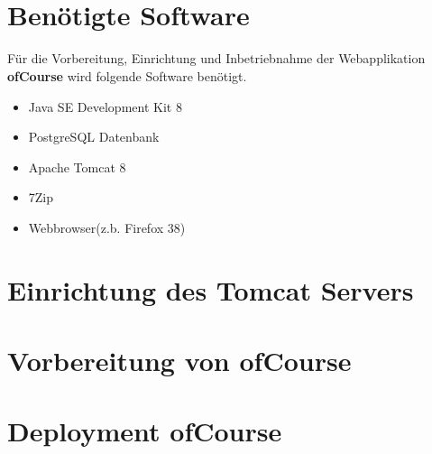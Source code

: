 \documentclass[a4paper, 12pt]{scrreprt}
\begin{document}
\begin{titlepage}
\begin{center}
        \ \\
        \ \\
       
        
        
    \end{center}
\end{titlepage}


\tableofcontents
\chapter{Benötigte Software}
Für die Vorbereitung, Einrichtung und Inbetriebnahme der Webapplikation \textbf{ofCourse} wird folgende Software benötigt.
\begin{itemize}
	\item Java SE Development Kit 8
	\item PostgreSQL Datenbank
	\item Apache Tomcat 8
	\item 7Zip
	\item Webbrowser(z.b. Firefox 38)
\end{itemize}
\chapter{Einrichtung des Tomcat Servers}

\chapter{Vorbereitung von ofCourse}
\chapter{Deployment ofCourse}
\end{document}
